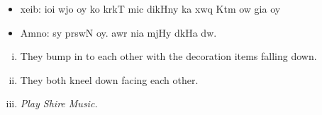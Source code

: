 \documentclass{article}
\begin{document}
	\begin{itemize}
		\item[] xeib: ioi wjo oy ko krkT mic dikHny ka xwq Ktm ow gia oy
		
		\item[] Amno:  sy  prswN oy. awr nia  mjHy dkHa dw.
	\end{itemize}

\begin{enpara}
	\begin{enumerate}[(i)]
		\item They bump in to each other with the decoration items falling down.

		\item They both kneel down facing each other.

		\item \textit{Play Shire Music.}
	\end{enumerate}
\end{enpara}
\end{document}
